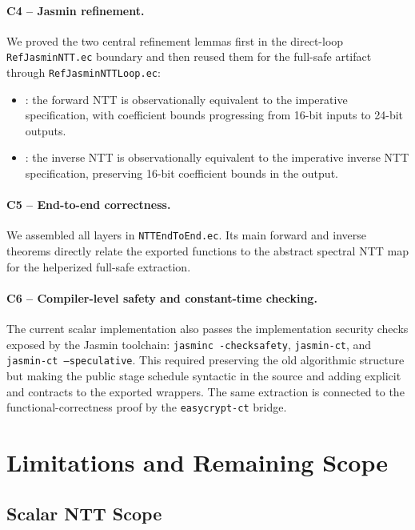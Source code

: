 \paragraph{C4 -- Jasmin refinement.}
We proved the two central refinement lemmas first in the direct-loop
\texttt{RefJasminNTT.ec} boundary and then reused them for the full-safe
artifact through \texttt{RefJasminNTT\allowbreak Loop.ec}:
\begin{itemize}
  \item {}: the \jasmin{} forward NTT is observationally
        equivalent to the imperative specification, with coefficient bounds
        progressing from 16-bit inputs to 24-bit outputs.
  \item {}: the \jasmin{} inverse NTT is
        observationally equivalent to the imperative inverse NTT specification,
        preserving 16-bit coefficient bounds in the output.
\end{itemize}

\paragraph{C5 -- End-to-end correctness.}
We assembled all layers in \texttt{NTTEndToEnd.ec}.  Its main forward and
inverse theorems directly relate the \jasmin{} exported functions to the
abstract spectral NTT map for the helperized full-safe extraction.

\paragraph{C6 -- Compiler-level safety and constant-time checking.}
The current scalar \jasmin{} implementation also passes the implementation
security checks exposed by the Jasmin toolchain: \texttt{jasminc -checksafety},
\texttt{jasmin-ct}, and \texttt{jasmin-ct --speculative}.  This required
preserving the old algorithmic structure but making the public stage schedule
syntactic in the source and adding explicit \jasm{\#[ct = "..."]} and
\jasm{\#[sct = "..."]} contracts to the exported wrappers.  The same
extraction is connected to the functional-correctness proof by the
\texttt{easycrypt-ct} bridge.

\section{Limitations and Remaining Scope}

\subsection{Scalar NTT Scope}

